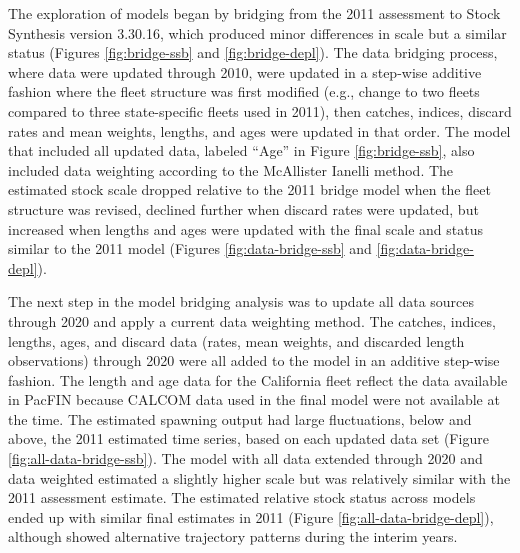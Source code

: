 \documentclass[11pt,
  english,
  a4paper,
]{article}
\begin{document}
The exploration of models began by bridging from the 2011 assessment to Stock Synthesis version 3.30.16, which produced minor differences in scale but a similar status (Figures \ref{fig:bridge-ssb} and \ref{fig:bridge-depl}). The data bridging process, where data were updated through 2010, were updated in a step-wise additive fashion where the fleet structure was first modified (e.g., change to two fleets compared to three state-specific fleets used in 2011), then catches, indices, discard rates and mean weights, lengths, and ages were updated in that order. The model that included all updated data, labeled ``Age'' in Figure \ref{fig:bridge-ssb}, also included data weighting according to the McAllister Ianelli method. The estimated stock scale dropped relative to the 2011 bridge model when the fleet structure was revised, declined further when discard rates were updated, but increased when lengths and ages were updated with the final scale and status similar to the 2011 model (Figures \ref{fig:data-bridge-ssb} and \ref{fig:data-bridge-depl}).

\leavevmode\tagmcend\tagstructend\par


The next step in the model bridging analysis was to update all data sources through 2020 and apply a current data weighting method. The catches, indices, lengths, ages, and discard data (rates, mean weights, and discarded length observations) through 2020 were all added to the model in an additive step-wise fashion. The length and age data for the California fleet reflect the data available in PacFIN because CALCOM data used in the final model were not available at the time. The estimated spawning output had large fluctuations, below and above, the 2011 estimated time series, based on each updated data set (Figure \ref{fig:all-data-bridge-ssb}). The model with all data extended through 2020 and data weighted estimated a slightly higher scale but was relatively similar with the 2011 assessment estimate. The estimated relative stock status across models ended up with similar final estimates in 2011 (Figure \ref{fig:all-data-bridge-depl}), although showed alternative trajectory patterns during the interim years.

\leavevmode\tagmcend\tagstructend\par

\end{document}
